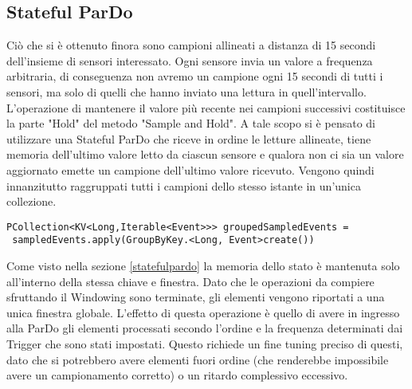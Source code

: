 \subsection{Stateful ParDo}\label{statefulimplem}
Ciò che si è ottenuto finora sono campioni allineati a distanza di 15 secondi dell'insieme di sensori interessato. Ogni sensore invia un valore a frequenza arbitraria, di conseguenza non avremo un campione ogni 15 secondi di tutti i sensori, ma solo di quelli che hanno inviato una lettura in quell'intervallo.
L'operazione di mantenere il valore più recente nei campioni successivi costituisce la parte "Hold" del metodo "Sample and Hold". A tale scopo si è pensato di utilizzare una Stateful ParDo che riceve in ordine le letture allineate, tiene memoria dell'ultimo valore letto da ciascun sensore e qualora non ci sia un valore aggiornato emette un campione dell'ultimo valore ricevuto. Vengono quindi innanzitutto raggruppati tutti i campioni dello stesso istante in un'unica collezione.
\begin{lstlisting}
PCollection<KV<Long,Iterable<Event>>> groupedSampledEvents =
 sampledEvents.apply(GroupByKey.<Long, Event>create())
\end{lstlisting}
Come visto nella sezione \ref{statefulpardo} la memoria dello stato è mantenuta solo all'interno della stessa chiave e finestra. Dato che le operazioni da compiere sfruttando il Windowing sono terminate, gli elementi vengono riportati a una unica finestra globale. L'effetto di questa operazione è quello di avere in ingresso alla ParDo gli elementi processati secondo l'ordine e la frequenza determinati dai Trigger che sono stati impostati.
Questo richiede un fine tuning preciso di questi, dato che si potrebbero avere elementi fuori ordine (che renderebbe impossibile avere un campionamento corretto) o un ritardo complessivo eccessivo.
